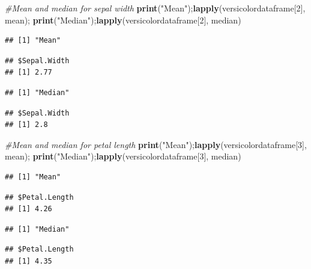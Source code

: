 \documentclass[]{article}
\newenvironment{Shaded}{\begin{snugshade}}{\end{snugshade}}
\newcommand{\CommentTok}[1]{\textcolor[rgb]{0.56,0.35,0.01}{\textit{#1}}}
\newcommand{\DecValTok}[1]{\textcolor[rgb]{0.00,0.00,0.81}{#1}}
\newcommand{\KeywordTok}[1]{\textcolor[rgb]{0.13,0.29,0.53}{\textbf{#1}}}
\newcommand{\NormalTok}[1]{#1}
\newcommand{\StringTok}[1]{\textcolor[rgb]{0.31,0.60,0.02}{#1}}
\begin{document}
\begin{Shaded}
\begin{Highlighting}[]
\CommentTok{#Mean and median for sepal width}
\KeywordTok{print}\NormalTok{(}\StringTok{"Mean"}\NormalTok{);}\KeywordTok{lapply}\NormalTok{(versicolordataframe[}\DecValTok{2}\NormalTok{], mean); }\KeywordTok{print}\NormalTok{(}\StringTok{"Median"}\NormalTok{);}\KeywordTok{lapply}\NormalTok{(versicolordataframe[}\DecValTok{2}\NormalTok{], median)}
\end{Highlighting}
\end{Shaded}

\begin{verbatim}
## [1] "Mean"
\end{verbatim}

\begin{verbatim}
## $Sepal.Width
## [1] 2.77
\end{verbatim}

\begin{verbatim}
## [1] "Median"
\end{verbatim}

\begin{verbatim}
## $Sepal.Width
## [1] 2.8
\end{verbatim}

\begin{Shaded}
\begin{Highlighting}[]
\CommentTok{#Mean and median for petal length}
\KeywordTok{print}\NormalTok{(}\StringTok{"Mean"}\NormalTok{);}\KeywordTok{lapply}\NormalTok{(versicolordataframe[}\DecValTok{3}\NormalTok{], mean); }\KeywordTok{print}\NormalTok{(}\StringTok{"Median"}\NormalTok{);}\KeywordTok{lapply}\NormalTok{(versicolordataframe[}\DecValTok{3}\NormalTok{], median)}
\end{Highlighting}
\end{Shaded}

\begin{verbatim}
## [1] "Mean"
\end{verbatim}

\begin{verbatim}
## $Petal.Length
## [1] 4.26
\end{verbatim}

\begin{verbatim}
## [1] "Median"
\end{verbatim}

\begin{verbatim}
## $Petal.Length
## [1] 4.35
\end{verbatim}
\end{document}
